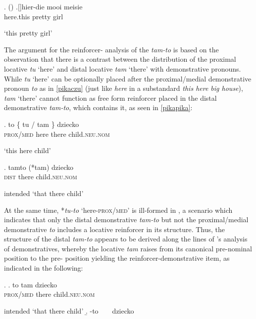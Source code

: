 \ex.  (\citealt[226--227]{Roehrs2010})
\ag.[]\hspace{-22pt}hier-die mooi meisie\\
\hspace{-22pt}here.this pretty girl\\
\hspace{-22pt}\strut `this pretty girl'

The argument for the reinforcer- analysis of the  \textit{tam-to} is based on the observation that there is a contrast between the distribution of the  proximal locative \textit{tu} `here' and distal locative \textit{tam} `there' with demonstrative pronouns. While \textit{tu} `here' can be optionally placed after the  proximal/medial demonstrative pronoun \textit{to} as in \ref{pikaczu}  (just like \textit{here} in a substandard  \textit{this here big house}), \textit{tam} `there' cannot function as free form reinforcer placed in the distal demonstrative \textit{tam-to}, which contains it, as seen in \ref{pikapika}:\largerpage

\exg. to \{ tu / {tam \}} dziecko\\
\textsc{prox/med} {} here {} there child.\textsc{neu.nom}\\
\strut `this here child'\label{pikaczu}

\exg. tamto (*tam) dziecko\\
\textsc{dist} \phantom{cl}there child.\textsc{neu.nom}\\
\strut intended `that there child'\label{pikapika}

At the same time, *\textit{tu-to} `here-\textsc{prox/med}' is ill-formed in , a scenario which indicates that only the distal demonstrative \textit{tam-to} but not the proximal/medial demonstrative \textit{to} includes a locative reinforcer in its structure. Thus, the structure of the distal \textit{tam-to} appears to be derived along the lines of \citeauthor{Leu2007}'s \citeyearpar{Leu2007} analysis of  demonstratives, whereby the locative \textit{tam} raises from its canonical pre-nominal position to the pre- position yielding the reinforcer-demonstrative item, as indicated in the following:
 
 \ex.
 \ag. to tam dziecko \\
\textsc{prox/med} there child.\textsc{neu.nom}\\
\strut intended `that there child'
\setlength{\arrowht}{2ex}
\newcommand*\cgdepthstrut{{\vrule height 0pt depth \arrowht width 0pt}}
\renewcommand\eachwordone{\cgdepthstrut\rmfamily}
\renewcommand\glt{\vskip -\topsep}
\let\trans=\glt
\newcommand\arrowex{\setlength{\arrowht}{1ex}\ex}
\b. -to {\ }  {\ } dziecko  

